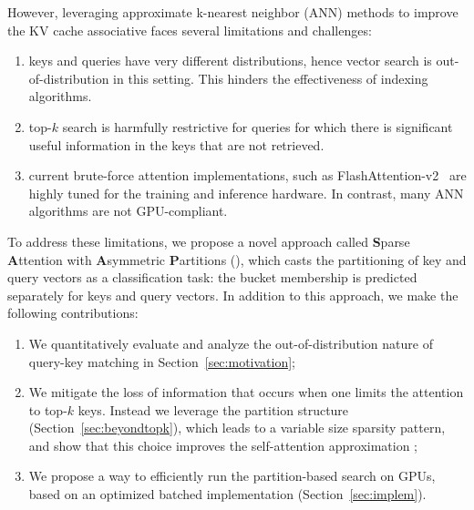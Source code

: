 However, leveraging approximate k-nearest neighbor (ANN) methods to improve the KV cache associative faces several limitations and challenges:
\ificml \\[-2.3em]\fi

\begin{enumerate}
\item 
keys and queries have very different distributions, hence vector search is out-of-distribution in this setting. This hinders the effectiveness of indexing algorithms.  \\[-1.8em]
\item 
top-$k$ search is harmfully restrictive for queries for which there is significant useful information in the keys that are not retrieved.  \\[-1.8em]
\item 
current brute-force attention implementations, such as FlashAttention-v2~\citep{daoflashattention} are highly tuned for the training and inference hardware. In contrast, many ANN algorithms are not GPU-compliant. 
\ificml  \\[-2em] \fi
\end{enumerate}

%

To address these limitations, we propose a novel approach called {\bf S}parse {\bf A}ttention with {\bf A}symmetric {\bf P}artitions (\OURS), which casts the partitioning of key and query vectors as a classification task: the bucket membership is predicted separately for keys and query vectors. %
%
%
In addition to this approach, we make the following contributions: 
\ificml \\[-2.3em] \fi

\begin{enumerate}
\item 
     We quantitatively evaluate and analyze the out-of-distribution nature of query-key matching in Section~\ref{sec:motivation};  \\[-1.6em]
\item 
     We mitigate the loss of information that occurs when one limits the attention to top-$k$ keys.
     Instead we leverage the partition structure (Section~\ref{sec:beyondtopk}), which leads to a variable size sparsity pattern, and show that this choice improves the self-attention approximation ; \\[-1.6em]
\item 
     We propose a way to efficiently run the partition-based search on GPUs, based on an optimized batched implementation (Section~\ref{sec:implem}).  
\ificml \\[-1.8em] \fi
\end{enumerate}

